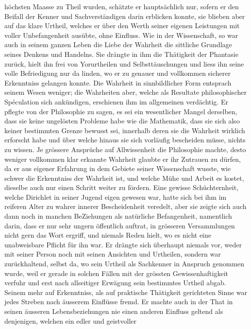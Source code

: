 \documentclass[11pt]{article}
\begin{document}
\noindent höchsten Maasse zu Theil wurden, schätzte er hauptsächlich nur, sofern er den Beifall der Kenner und Sachverständigen darin erblicken konnte, sie blieben aber auf das klare Urtheil, welches er über den Werth seiner eigenen Leistungen mit voller Unbefangenheit ausübte, ohne Einfluss. Wie in der Wissenschaft, so war auch in seinem ganzen Leben die Liebe der Wahrheit die sittliche Grundlage seines Denkens und Handelns. Sie drängte in ihm die Thätigkeit der Phantasie zurück, hielt ihn frei von Yorurtheilen und Selbsttäuschungen und liess ihn seine volle Befriedigung nur da linden, wo er zu genauer und vollkommen sicherer Erkenntniss gelangen konnte. Die Wahrheit in sinnbildlicher Form entsprach seinem Wesen weniger; die Wahrheiten aber, welche als Resultate philosophischer Spéculation sich ankündigen, erschienen ihm im allgemeinen verdächtig. Er pflegte von der Philosophie zu sagen, es sei ein wesentlicher Mangel derselben, dass sie keine ungelösten Probleme habe wie die Mathematik, dass sie sich also keiner bestimmten Grenze bewusst sei, innerhalb deren sie die Wahrheit wirklich erforscht habe und über welche hinaus sie sich vorläufig bescheiden müsse, nichts zu wissen. Je grössere Ansprüche auf Allwissenheit die Philosophie machte, desto weniger vollkommen klar erkannte Wahrheit glaubte er ihr Zutrauen zu dürfen, da er aus eigener Erfahrung in dem Gebiete seiner Wissenschaft wusste, wie schwer die Erkenntniss der Wahrheit ist, und welche Mühe und Arbeit es kostet, dieselbe auch nur einen Schritt weiter zu fördern. Eine gewisse Schüchternheit, welche Dirichlet in seiner Jugend eigen gewesen war, hatte sich bei ihm im reiferen Alter zu wahrer innerer Bescheidenheit veredelt, aber sie zeigte sich auch dann noch in manchen BeZiehungen als natürliche Befangenheit, namentlich darin, dass er nur sehr ungern öffentlich auftrat, in grösseren Versammlungen nicht gern das Wort ergriff, und niemals Reden hielt, wo es nicht eine unabweisbare Pflicht für ihn war. Er drängte sich überhaupt niemals vor, weder mit seiner Person noch mit seinen Ansichten und Urtheilen, sondern war zurückhaltend, selbst da, wo sein Urtheil als Sachkenner in Anspruch genommen wurde, weil er gerade in solchen Fällen mit der grössten Gewissenhaftigkeit verfuhr und erst nach allseitiger Erwägung sein bestimmtes Urtheil abgab. Seinem mehr auf Erkenntniss, als auf praktische Thätigkeit gerichteten Sinne war jedes Streben nach äusserem Einflüsse fremd. Er machte auch in der That in seinen äusseren Lebensbeziehungen nie einen anderen Einfluss geltend als denjenigen, welchen ein edler und geistvoller 
\par
\end{document}
